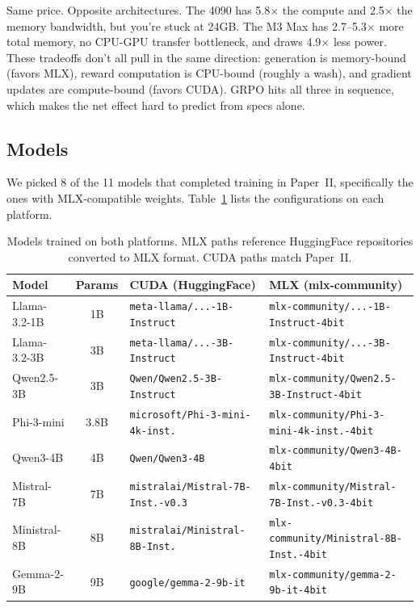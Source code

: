 \documentclass[11pt]{article}
\begin{document}
Same price.  Opposite architectures.  The 4090 has 5.8$\times$ the compute and 2.5$\times$ the memory bandwidth, but you're stuck at 24GB.  The M3 Max has 2.7--5.3$\times$ more total memory, no CPU-GPU transfer bottleneck, and draws 4.9$\times$ less power.  These tradeoffs don't all pull in the same direction: generation is memory-bound (favors MLX), reward computation is CPU-bound (roughly a wash), and gradient updates are compute-bound (favors CUDA).  GRPO hits all three in sequence, which makes the net effect hard to predict from specs alone.

\subsection{Models}

We picked 8 of the 11 models that completed training in Paper~II, specifically the ones with MLX-compatible weights.  Table~\ref{tab:models} lists the configurations on each platform.

\begin{table}[t]
\centering
\caption{Models trained on both platforms.  MLX paths reference HuggingFace repositories converted to MLX format.  CUDA paths match Paper~II.}
\label{tab:models}
\small
\begin{tabular}{l c l l}
\toprule
\textbf{Model} & \textbf{Params} & \textbf{CUDA (HuggingFace)} & \textbf{MLX (mlx-community)} \\
\midrule
Llama-3.2-1B & 1B & \texttt{meta-llama/...-1B-Instruct} & \texttt{mlx-community/...-1B-Instruct-4bit} \\
Llama-3.2-3B & 3B & \texttt{meta-llama/...-3B-Instruct} & \texttt{mlx-community/...-3B-Instruct-4bit} \\
Qwen2.5-3B & 3B & \texttt{Qwen/Qwen2.5-3B-Instruct} & \texttt{mlx-community/Qwen2.5-3B-Instruct-4bit} \\
Phi-3-mini & 3.8B & \texttt{microsoft/Phi-3-mini-4k-inst.} & \texttt{mlx-community/Phi-3-mini-4k-inst.-4bit} \\
Qwen3-4B & 4B & \texttt{Qwen/Qwen3-4B} & \texttt{mlx-community/Qwen3-4B-4bit} \\
Mistral-7B & 7B & \texttt{mistralai/Mistral-7B-Inst.-v0.3} & \texttt{mlx-community/Mistral-7B-Inst.-v0.3-4bit} \\
Ministral-8B & 8B & \texttt{mistralai/Ministral-8B-Inst.} & \texttt{mlx-community/Ministral-8B-Inst.-4bit} \\
Gemma-2-9B & 9B & \texttt{google/gemma-2-9b-it} & \texttt{mlx-community/gemma-2-9b-it-4bit} \\
\bottomrule
\end{tabular}
\end{table}
\end{document}
